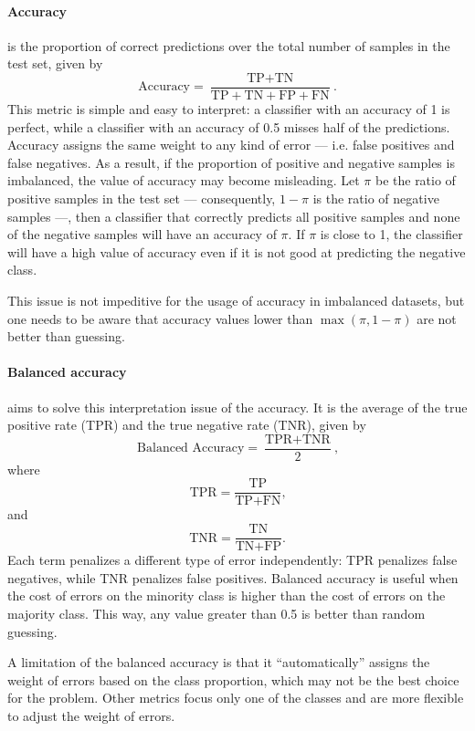 \paragraph{Accuracy} is the proportion of correct predictions over the total number of
samples in the test set, given by
\begin{equation*}
  \text{Accuracy} = \frac{\text{TP} + \text{TN}}{\text{TP} + \text{TN} + \text{FP} + \text{FN}}\text{.}
\end{equation*}
This metric is simple and easy to interpret: a classifier with an accuracy of 1 is
perfect, while a classifier with an accuracy of 0.5 misses half of the predictions.
Accuracy assigns the same weight to any kind of error --- i.e. false positives and false
negatives.  As a result, if the proportion of positive and negative samples is imbalanced,
the value of accuracy may become misleading.  Let $\pi$ be the ratio of positive samples in
the test set --- consequently, $1-\pi$ is the ratio of negative samples ---, then a
classifier that correctly predicts all positive samples and none of the negative samples
will have an accuracy of $\pi$.  If $\pi$ is close to 1, the classifier will have a high value
of accuracy even if it is not good at predicting the negative class.

This issue is not impeditive for the usage of accuracy in imbalanced datasets, but one
needs to be aware that accuracy values lower than $\max(\pi, 1-\pi)$ are not better than
guessing.

\paragraph{Balanced accuracy} aims to solve this interpretation issue of the accuracy.  It
is the average of the true positive rate (TPR) and the true negative rate (TNR), given by
\begin{equation*}
  \text{Balanced Accuracy} = \frac{\text{TPR} + \text{TNR}}{2}\text{,}
\end{equation*}
where
\[
  \text{TPR} = \frac{\text{TP}}{\text{TP} + \text{FN}}\text{,}
\]
and
\[
  \text{TNR} = \frac{\text{TN}}{\text{TN} + \text{FP}}\text{.}
\]
Each term penalizes a different type of error independently: TPR penalizes false
negatives, while TNR penalizes false positives.  Balanced accuracy is useful when the cost
of errors on the minority class is higher than the cost of errors on the majority class.
This way, any value greater than 0.5 is better than random guessing.

A limitation of the balanced accuracy is that it ``automatically'' assigns the weight of
errors based on the class proportion, which may not be the best choice for the problem.
Other metrics focus only one of the classes and are more flexible to adjust the weight of
errors.

